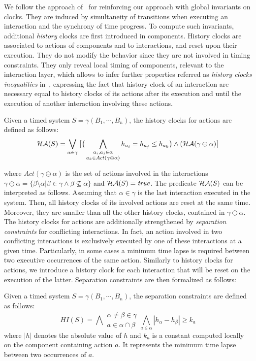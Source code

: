 We follow the approach of~\cite{} for reinforcing our approach with global invariants on clocks.
They are induced by simultaneity of transitions when executing an 
interaction and the synchrony of time progress. To compute such invariants, additional 
\emph{history} clocks are first introduced in components. History clocks are associated to 
actions of components and to interactions, and reset upon their execution.
They do not modify the behavior since they are not involved in timing constraints.
They only reveal local timing of components, relevant to the interaction layer, which 
allows to infer further properties referred as \emph{history clocks inequalities} 
in~\cite{}, expressing the fact that history clock of an interaction are necessary 
equal to history clocks of its actions after its execution and until the execution of another 
interaction involving these actions.

\begin{definition}
Given a timed system $S=\gamma(B_1,\cdots,B_n)$, the history clocks for actions are defined
as follows:
  $$\mathcal{HA}(S)=\bigvee_{\alpha\in\gamma}\big[\big(\bigwedge_{\substack{a_i,a_j\in\alpha\\
  a_k\in Act(\gamma\ominus\alpha)}}h_{a_i}=h_{a_j}\le h_{a_k}\big)\wedge(\mathcal{HA}(\gamma\ominus
  \alpha)\big]$$
\end{definition}
where $Act(\gamma\ominus\alpha)$ is the set of actions involved in the interactions
$\gamma\ominus\alpha=\{\beta\setminus\alpha|\beta\in\gamma\wedge\beta\nsubseteq\alpha\}$
and $\mathcal{HA}(S)=\textnormal{\textit{true}}$.
The predicate $\mathcal{HA}(S)$ can be interpreted as follows. Assuming that $\alpha\in\gamma$
is the last interaction executed in the system. Then, all history clocks of its involved
actions are reset at the same time. Moreover, they are smaller than all the other history
clocks, contained in $\gamma\ominus\alpha$.
The history clocks for actions are additionally strengthened by \emph{separation constraints}
for conflicting interactions. In fact, an action involved in two conflicting interactions
is exclusively executed by one of these interactions at a given time. Particularly,
in some cases a minimum time lapse is required between two executive occurrences of
the same action. Similarly to history clocks for actions, we introduce a history clock for
each interaction that will be reset on the execution of the latter.
Separation constraints are then formalized as follows:

\begin{definition}
Given a timed system $S=\gamma(B_1,\cdots,B_n)$, the separation constraints are defined
as follows:
  $$HI(S)=\bigwedge{\substack{\alpha\neq\beta\in\gamma\\a\in\alpha\cap\beta}}
  \bigwedge_{a\in\alpha} |h_{\alpha}-h_{\beta}|\ge k_a$$
where $|h|$ denotes the absolute value of $h$ and $k_a$ is a constant computed locally
on the component containing action $a$. It represents the minimum time lapse between
two occurrences of $a$.
\end{definition}

